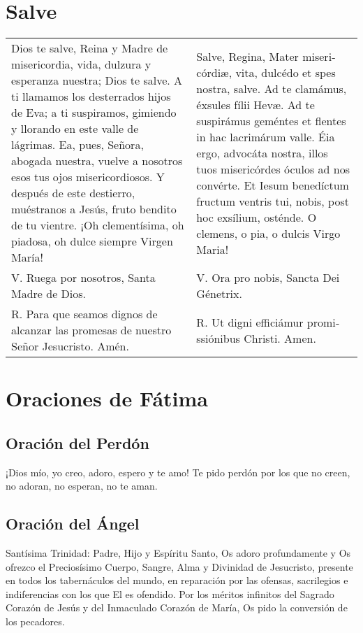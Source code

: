 \documentclass[11pt,a4paper]{book}
\begin{document}
    \section*{Salve}\label{sec:salve}
    \begin{longtable} { p{} p{} }
        Dios te salve, Reina y Madre de mi­se­ri­cordia, vida, dulzura y esperanza nuestra; Dios te salve. 
        A ti llamamos los desterrados hijos de Eva; a ti suspiramos, gimiendo y llorando en este valle de lágrimas. 
        Ea, pues, Señora, abogada nuestra, vuelve a nosotros esos tus ojos mi­se­ri­cordiosos. Y después de este destierro, muéstranos a Jesús, 
        fruto bendito de tu vientre. ¡Oh cle­men­tísima, oh piadosa, oh dulce siempre Virgen María! &
        Salve, Regina, Mater mi­se­ri­córdiæ, vita, dulcédo et spes nostra, salve. Ad te clamámus, éxsules fílii Hevæ. 
        Ad te suspirámus geméntes et flentes in hac lacrimárum valle. Éia ergo, advocáta nostra, illos tuos mi­se­ri­córdes óculos ad nos convérte. 
        Et Iesum benedíctum fructum ventris tui, nobis, post hoc exsílium, osténde. O clemens, o pia, o dulcis Virgo Maria!\\
        
        V. Ruega por nosotros, Santa Madre de Dios. & V. Ora pro nobis, Sancta Dei Génetrix.\\
        
        R. Para que seamos dignos de alcanzar las promesas de nuestro Señor Jesucristo. Amén. & 
        R. Ut digni efficiámur pro­mi­ssiónibus Christi. Amen.
    \end{longtable}

    \section*{Oraciones de Fátima}

    \subsection*{Oración del Perdón}\label{subsec:forgivenessPrayer}
    ¡Dios mío, yo creo, adoro, espero y te amo! Te pido perdón por los que no creen, no adoran, no esperan, no te aman.

    \subsection*{Oración del Ángel}\label{subsec:angelPrayer}
    Santísima Trinidad: Padre, Hijo y Espíritu Santo, Os adoro profundamente y Os ofrezco el Preciosísimo Cuerpo, Sangre, Alma y Divinidad de Jesucristo, 
    presente en todos los tabernáculos del mundo, en reparación por las ofensas, sacrilegios e indiferencias con los que El es ofendido. Por los méritos 
    infinitos del Sagrado Corazón de Jesús y del Inmaculado Corazón de María, Os pido la conversión de los pecadores.
\end{document}
